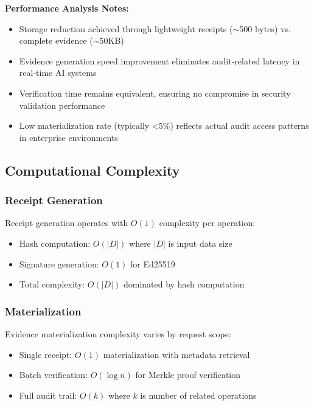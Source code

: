 \documentclass[12pt,a4paper]{article}
\begin{document}
\textbf{Performance Analysis Notes:}
\begin{itemize}
\item Storage reduction achieved through lightweight receipts ($\sim$500 bytes) vs. complete evidence ($\sim$50KB)
\item Evidence generation speed improvement eliminates audit-related latency in real-time AI systems
\item Verification time remains equivalent, ensuring no compromise in security validation performance
\item Low materialization rate (typically <5\%) reflects actual audit access patterns in enterprise environments
\end{itemize}

\subsection{Computational Complexity}

\subsubsection{Receipt Generation}

Receipt generation operates with $O(1)$ complexity per operation:

\begin{itemize}
\item Hash computation: $O(|D|)$ where $|D|$ is input data size
\item Signature generation: $O(1)$ for Ed25519
\item Total complexity: $O(|D|)$ dominated by hash computation
\end{itemize}

\subsubsection{Materialization}

Evidence materialization complexity varies by request scope:

\begin{itemize}
\item Single receipt: $O(1)$ materialization with metadata retrieval
\item Batch verification: $O(\log n)$ for Merkle proof verification
\item Full audit trail: $O(k)$ where $k$ is number of related operations
\end{itemize}
\end{document}
